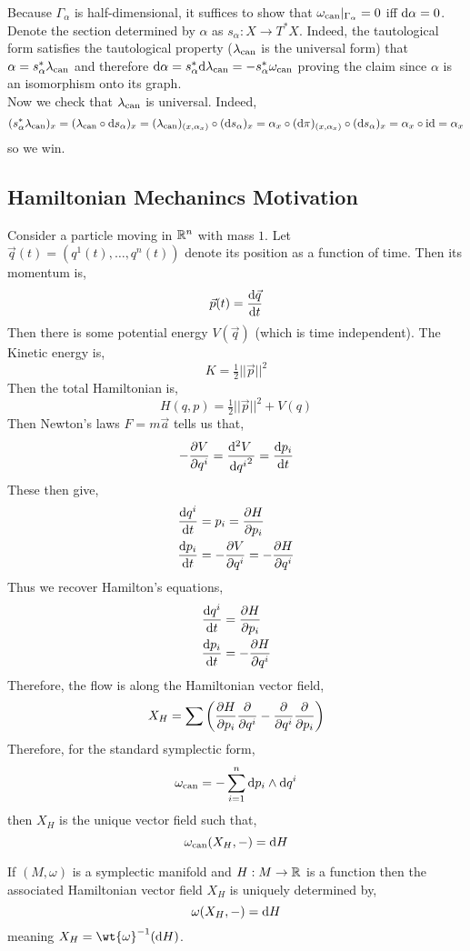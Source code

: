 \documentclass[12pt]{article}
\begin{document}
Because $\Gamma_\alpha$ is half-dimensional, it suffices to show that $\omega_{\text{can}}|_{\Gamma_\alpha} = 0$ iff $\mathrm{d}{\alpha} = 0$. Denote the section determined by $\alpha$ as $s_\alpha : X \to T^*X$. Indeed, the tautological form satisfies the tautological property ($\lambda_{\text{can}}$ is the universal form) that $\alpha = s_\alpha^* \lambda_{\text{can}}$ and therefore $\mathrm{d}{\alpha} = s_\alpha^* \mathrm{d}{\lambda_{\text{can}}} = - s_{\alpha}^* \omega_{\text{can}}$ proving the claim since $\alpha$ is an isomorphism onto its graph. 
\bigskip\\
Now we check that $\lambda_{\text{can}}$ is universal. Indeed, 
\[ (s_\alpha^* \lambda_{\text{can}})_x = (\lambda_{\text{can}} \circ \mathrm{d}{s_\alpha})_x = (\lambda_{\text{can}})_{(x, \alpha_x)} \circ (\mathrm{d}{s_\alpha})_x = \alpha_x \circ (\mathrm{d}{\pi})_{(x, \alpha_x)} \circ (\mathrm{d}{s_{\alpha}})_x = \alpha_x \circ \mathrm{id} = \alpha_x \]
so we win. 


\subsection{Hamiltonian Mechanincs Motivation}

Consider a particle moving in $\mathbb{R}^n$ with mass $1$. Let $\vec{q}(t) = (q^1(t), \dots, q^n(t))$ denote its position as a function of time. Then its momentum is,
\[ \vec{p}(t) = \frac{\mathrm{d}{\vec{q}}}{\mathrm{d}{t}} \]
Then there is some potential energy $V(\vec{q})$ (which is time independent). The Kinetic energy is,
\[ K = \tfrac{1}{2} || \vec{p} ||^2 \]
Then the total Hamiltonian is,
\[ H(q,p) = \tfrac{1}{2} || \vec{p} ||^2 + V(q) \]
Then Newton's laws $F = m \vec{a}$ tells us that,
\[ - \frac{\partial{V}}{\partial{q^i}} = \frac{\mathrm{d}^{2} V \:}{\mathrm{d}{q^i}^{2}} = \frac{\mathrm{d}{p_i}}{\mathrm{d}{t}} \]
These then give,
\begin{align*}
\frac{\mathrm{d}{q^i}}{\mathrm{d}{t}} &= p_i = \frac{\partial{H}}{\partial{p_i}} 
\\
\frac{\mathrm{d}{p_i}}{\mathrm{d}{t}} &= - \frac{\partial{V}}{\partial{q^i}} = - \frac{\partial{H}}{\partial{q^i}} 
\end{align*}
Thus we recover Hamilton's equations,
\begin{align*}
\frac{\mathrm{d}{q^i}}{\mathrm{d}{t}} &= \frac{\partial{H}}{\partial{p_i}}
\\
\frac{\mathrm{d}{p_i}}{\mathrm{d}{t}} &= - \frac{\partial{H}}{\partial{q^i}} 
\end{align*}
Therefore, the flow is along the Hamiltonian vector field,
\[ X_H = \sum \left( \frac{\partial{H}}{\partial{p_i}} \frac{\partial{}}{\partial{q^i}} - \frac{\partial{}}{\partial{q^i}} \frac{\partial{}}{\partial{p_i}} \right) \]
Therefore, for the standard symplectic form,
\[ \omega_{\text{can}} = - \sum_{i = 1}^n \mathrm{d}{p_i} \wedge \mathrm{d}{q^i} \]
then $X_H$ is the unique vector field such that,
\[ \omega_{\text{can}}(X_H, -) = \mathrm{d}{H} \]

\begin{defn}
If $(M, \omega)$ is a symplectic manifold and $H : M \to \mathbb{R}$ is a function then the associated Hamiltonian vector field $X_H$ is uniquely determined by,
\[ \omega(X_H, -) = \mathrm{d}{H} \]
meaning $X_H = \wt{\omega}^{-1}(\d{H})$.
\end{defn}
\end{document}
